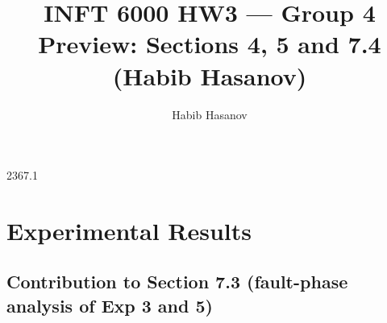 \documentclass[10pt,twocolumn]{article}
\title{INFT 6000 HW3 --- Group 4\\\large Preview: Sections 4, 5 and 7.4 (Habib Hasanov)}
\author{Habib Hasanov}\date{}
\begin{document}
\maketitle
\makeatletter
\def\hhstub#1#2{\expandafter\gdef\csname r@#1\endcsname{{#2}{}{}{}{}}}
\hhstub{sec:architecture}{2}\hhstub{sec:consistency}{3}\hhstub{sec:cap}{6}\hhstub{sec:setup}{7.1}
\makeatother
\setcounter{section}{3}


\setcounter{section}{6}
\section{Experimental Results}
\setcounter{subsection}{3}

\subsection*{Contribution to Section 7.3 (fault-phase analysis of Exp 3 and 5)}



\end{document}
